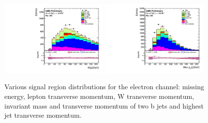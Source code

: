 \begin{figure}[htbp]
		\includegraphics[width=0.48\textwidth]{Figures/Results/Muon/prefit/Wbb_H_mass_doQCD1.pdf}
		\includegraphics[width=0.48\textwidth]{Figures/Results/Muon/prefit/Wbb_max_hJet_pt_doQCD1.pdf}		
	\caption[Signal region detector level distributions for the muon channel]{Various signal region distributions for the electron channel: missing energy, lepton transverse momentum, W transverse momentum, invariant mass and transverse momentum of two b jets and highest jet transverse momentum.}
	\label{fig:Wbb_prefit_muon}
\end{figure}
